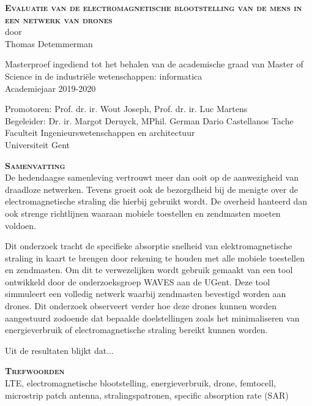 \begin{center}
\textsc{\textbf{\Huge Evaluatie van de electromagnetische blootstelling van de mens in een netwerk van drones}}\\

door\\
Thomas Detemmerman

Masterproef ingediend tot het behalen van de academische graad van Master of Science in de
industri\"ele wetenschappen: informatica\\
Academiejaar 2019-2020

Promotoren: Prof. dr. ir. Wout Joseph, Prof. dr. ir. Luc Martens\\
Begeleider: Dr. ir. Margot Deruyck, MPhil. German Dario Castellanos Tache\\
Faculteit Ingenieurswetenschappen en architectuur\\
Universiteit Gent
\end{center}

\textsc{\textbf{\LARGE Samenvatting}}\\

De hedendaagse samenleving vertrouwt meer dan ooit op de aanwezigheid van draadloze netwerken. 
Tevens groeit ook de bezorgdheid bij de menigte over de electromagnetische straling die hierbij gebruikt wordt. De overheid hanteerd dan ook
strenge richtlijnen waaraan mobiele toestellen en zendmasten moeten voldoen.

Dit onderzoek tracht de specifieke absorptie snelheid van elektromagnetische straling in kaart te brengen door rekening te houden met alle mobiele 
toestellen en zendmasten. Om dit te verwezelijken wordt gebruik gemaakt van een tool ontwikkeld door de onderzoeksgroep WAVES aan de UGent. Deze tool
simmuleert een volledig netwerk waarbij zendmasten bevestigd worden aan drones. Dit onderzoek observeert verder hoe deze drones kunnen worden aangestuurd
zodoende dat bepaalde doelstellingen zoals het minimaliseren van energieverbruik of electromagnetische straling bereikt kunnen worden.

Uit de resultaten blijkt dat...

\textsc{\textbf{\LARGE Trefwoorden}}\\

LTE, electromagnetische blootstelling, energieverbruik, drone, femtocell, microstrip patch antenna, stralingspatronen, specific absorption rate (SAR)

